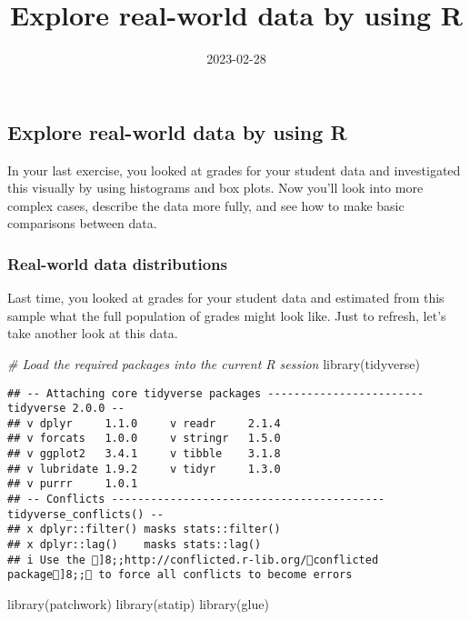 \documentclass[
]{article}
\title{Explore real-world data by using R}
\author{}
\date{\vspace{-2.5em}2023-02-28}
\newenvironment{Shaded}{\begin{snugshade}}{\end{snugshade}}
\newcommand{\CommentTok}[1]{\textcolor[rgb]{0.56,0.35,0.01}{\textit{#1}}}
\newcommand{\FunctionTok}[1]{\textcolor[rgb]{0.00,0.00,0.00}{#1}}
\newcommand{\NormalTok}[1]{#1}
\begin{document}
\maketitle

\hypertarget{explore-real-world-data-by-using-r}{%
\subsection{Explore real-world data by using
R}\label{explore-real-world-data-by-using-r}}

In your last exercise, you looked at grades for your student data and
investigated this visually by using histograms and box plots. Now you'll
look into more complex cases, describe the data more fully, and see how
to make basic comparisons between data.

\hypertarget{real-world-data-distributions}{%
\subsubsection{Real-world data
distributions}\label{real-world-data-distributions}}

Last time, you looked at grades for your student data and estimated from
this sample what the full population of grades might look like. Just to
refresh, let's take another look at this data.

\begin{Shaded}
\begin{Highlighting}[]
\CommentTok{\# Load the required packages into the current R session}
\FunctionTok{library}\NormalTok{(tidyverse)}
\end{Highlighting}
\end{Shaded}

\begin{verbatim}
## -- Attaching core tidyverse packages ------------------------ tidyverse 2.0.0 --
## v dplyr     1.1.0     v readr     2.1.4
## v forcats   1.0.0     v stringr   1.5.0
## v ggplot2   3.4.1     v tibble    3.1.8
## v lubridate 1.9.2     v tidyr     1.3.0
## v purrr     1.0.1     
## -- Conflicts ------------------------------------------ tidyverse_conflicts() --
## x dplyr::filter() masks stats::filter()
## x dplyr::lag()    masks stats::lag()
## i Use the ]8;;http://conflicted.r-lib.org/conflicted package]8;; to force all conflicts to become errors
\end{verbatim}

\begin{Shaded}
\begin{Highlighting}[]
\FunctionTok{library}\NormalTok{(patchwork)}
\FunctionTok{library}\NormalTok{(statip)}
\FunctionTok{library}\NormalTok{(glue)}
\end{Highlighting}
\end{Shaded}
\end{document}

